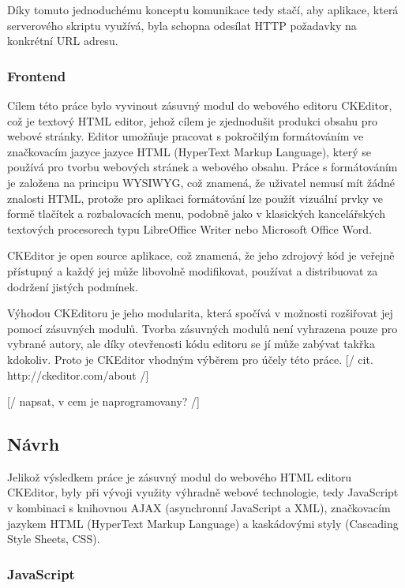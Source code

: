 \documentclass{article}
\begin{document}
Díky tomuto jednoduchému konceptu komunikace tedy stačí, aby aplikace, která serverového skriptu využívá, byla schopna odesílat HTTP požadavky na konkrétní URL adresu. 

\subsubsection{Frontend}

Cílem této práce bylo vyvinout zásuvný modul do webového editoru CKEditor, což je textový HTML editor, jehož cílem je zjednodušit produkci obsahu pro webové stránky. Editor umožňuje pracovat s pokročilým formátováním ve značkovacím jazyce jazyce HTML (HyperText Markup Language), který se používá pro tvorbu webových stránek a webového obsahu. Práce s formátováním je založena na principu WYSIWYG, což znamená, že uživatel nemusí mít žádné znalosti HTML, protože pro aplikaci formátování lze použít vizuální prvky ve formě tlačítek a rozbalovacích menu, podobně jako v klasických kancelářských textových procesorech typu LibreOffice Writer nebo Microsoft Office Word.

CKEditor je open source aplikace, což znamená, že jeho zdrojový kód je veřejně přístupný a každý jej může libovolně modifikovat, používat a distribuovat za dodržení jistých podmínek. 

Výhodou CKEditoru je jeho modularita, která spočívá v možnosti rozšiřovat jej pomocí zásuvných modulů. Tvorba zásuvných modulů není vyhrazena pouze pro vybrané autory, ale  díky otevřenosti kódu editoru se jí může zabývat takřka kdokoliv. Proto je CKEditor vhodným výběrem pro účely této práce. [/ cit. http://ckeditor.com/about /]

[/ napsat, v cem je naprogramovany? /]

\subsection{Návrh}

Jelikož výsledkem práce je zásuvný modul do webového HTML editoru CKEditor, byly při vývoji využity výhradně webové technologie, tedy JavaScript v kombinaci s knihovnou AJAX (asynchronní JavaScript a XML), značkovacím jazykem HTML (HyperText Markup Language) a kaskádovými styly (Cascading Style Sheets, CSS). 

\subsubsection{JavaScript}
\end{document}
